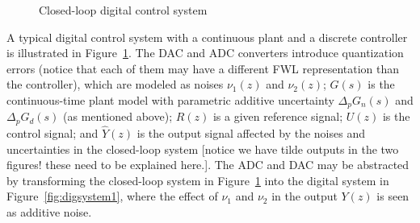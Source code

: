 \documentclass[final]{sig-alternate-05-2015}
\newcommand{\aabatecmt}[1]{}%
\newcommand{\red}[1]{{\color{red}#1}}
\begin{document}
\begin{figure}[htb]
{
}
 \caption{Closed-loop digital control system \aabatecmt{[has this hatted notation for the continuous-frequency plant ever been introduced?]} \label{fig:sampledsystem}}
\end{figure}


A typical digital control system with a continuous plant and a discrete
controller is illustrated in Figure~\ref{fig:sampledsystem}.  The DAC and
ADC converters introduce quantization errors (notice that each of them
may have a different FWL representation than the controller),
which are modeled as noises
$\nu_{1}(z)$ and $\nu_{2}(z)$;  
$G(s)$ is the continuous-time plant model
with parametric additive uncertainty $\Delta_p{G}_n(s)$ and $\Delta_p{G}_d(s)$ (as mentioned above);  
$R(z)$ is a given reference signal; 
$U(z)$ is the control signal; 
and $\hat{Y}(z)$ is the output signal affected by the noises and uncertainties in the closed-loop system 
\red{[notice we have tilde outputs in the two figures! these need to be explained here.]}. 
%
%
%
The ADC and DAC may be abstracted by transforming the closed-loop system in
Figure~\ref{fig:sampledsystem} into the digital system in 
Figure~\ref{fig:digsystem1}, 
where 
the effect of $\nu_{1}$ and $\nu_{2}$ in the output $Y(z)$ is
seen as additive noise.  
\end{document}
